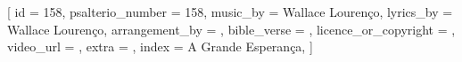 

[
    id                     = {158},
    psalterio_number       = {158},
    music_by               = {Wallace Lourenço},
    lyrics_by              = {Wallace Lourenço},
    arrangement_by         = {},
    bible_verse            = {},
    licence_or_copyright   = {},
    video_url              = {},
    extra                  = {},
    index                  = {A Grande Esperança},
]



\beginverse

